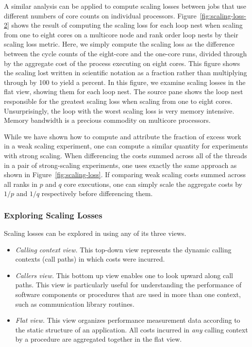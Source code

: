 \documentclass[11pt,letterpaper]{report}
\begin{document}
A similar analysis can be applied to compute scaling losses between jobs that use different numbers of core counts on individual processors.
 Figure~\ref{fig:scaling-loss-2} shows the result of computing  the scaling loss for each loop nest when scaling from one to eight cores on a multicore node and rank order loop nests by their scaling loss metric. Here, we simply compute the scaling loss as the difference between the cycle counts of the eight-core and the one-core runs, divided through by the aggregate cost of the process executing on eight cores. This figure shows the scaling lost written in scientific notation as a fraction rather than multiplying through by 100 to yield a percent.
In this figure, we examine scaling losses in the flat view, showing them for each loop nest.
The source pane shows the loop nest responsible for the greatest scaling loss when scaling from one to eight cores.
Unsurprisingly, the loop with the worst scaling loss is very memory intensive.
Memory bandwidth is a precious commodity on multicore processors.

While we have shown how to compute and attribute the fraction of excess work in a weak scaling experiment, one can compute a similar quantity for experiments with strong scaling. When differencing the costs summed across all of the threads in a pair of strong-scaling experiments, one uses exactly the same approach as shown in Figure~\ref{fig:scaling-loss}. If comparing weak scaling costs summed across all ranks in $p$ and $q$ core executions, one can simply scale the aggregate costs by $1/p$ and $1/q$ respectively before differencing them. 


\subsubsection{Exploring Scaling Losses}

Scaling losses can be explored in \hpcviewer{} using any of its three views.

\begin{itemize}
\item {\em Calling context view.} This top-down view represents the dynamic calling contexts (call paths) in which costs were incurred. 

\item {\em Callers view.} This bottom up view enables one to look upward along call paths. This view is particularly useful for understanding the performance of software components or procedures that are used in more than one context, such as communication library routines.

\item {\em Flat view.} This view organizes performance measurement data according to the static structure of an application. All costs incurred in {\em any} calling context by a procedure are aggregated together in the flat view. 
\end{itemize}
\end{document}
